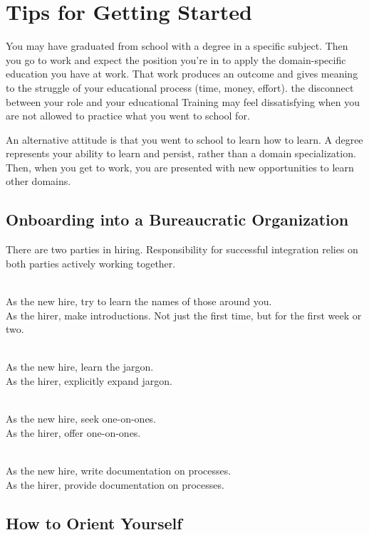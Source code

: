 \section{Tips for Getting Started}

You may have graduated from school with a degree in a specific subject. Then you go to work and expect the position you're in to apply the domain-specific education you have at work. That work produces an outcome and gives meaning to the struggle of your educational process (time, money, effort). the disconnect between your role and your educational Training may feel dissatisfying when you are not allowed to practice what you went to school for.

An alternative attitude is that you went to school to learn how to learn. A degree represents your ability to learn and persist, rather than a domain specialization. Then, when you get to work, you are presented with new opportunities to learn other domains. 

\subsection*{Onboarding into a Bureaucratic Organization}

There are two parties in hiring. Responsibility for successful integration relies on both parties actively working together.

\ \\
As the new hire, try to learn the names of those around you.\\
As the hirer, make introductions. Not just the first time, but for the first week or two.

\ \\
As the new hire, learn the jargon.\\
As the hirer, explicitly expand jargon.

\ \\
As the new hire, seek one-on-ones.\\
As the hirer, offer one-on-ones.

\ \\
As the new hire, write documentation on processes.\\
As the hirer, provide documentation on processes.

\subsection*{How to Orient Yourself}

